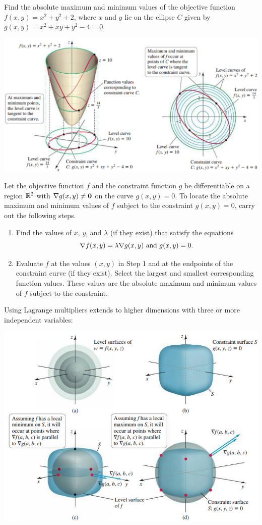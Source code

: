 \documentclass[mathNotesPreamble]{subfiles}
\begin{document}
  \begin{ex*}
    Find the absolute maximum and minimum values of the objective function $f(x,y)=x^2+y^2+2$, where $x$ and $y$ lie on the ellipse $C$ given by $g(x,y)=x^2+xy+y^2-4=0$.
  \end{ex*}
  \begin{flushright}
    \includegraphics[width=0.65\linewidth]{images/briggs_15_08/fig15_81}
  \end{flushright}
  \pagebreak

  \begin{thmBox*}
    Let the objective function $f$ and the constraint function $g$ be differentiable on a region $\mathbb{R}^2$ with $\nabla g(x,y)\neq\mathbf{0}$ on the curve $g(x,y)=0$. To locate the absolute maximum and minimum values of $f$ subject to the constraint $g(x,y)=0$, carry out the following steps.
    \begin{enumerate}
      \item 
        Find the values of $x$, $y$, and $\lambda$ (if they exist) that satisfy the equations
          \[\nabla f(x,y)=\lambda \nabla g(x,y) \textnormal{ and } g(x,y)=0.\]
      \item 
        Evaluate $f$ at the values $(x,y)$ in Step 1 and at the endpoints of the constraint curve (if they exist). Select the largest and smallest corresponding function values. These values are the absolute maximum and minimum values of $f$ subject to the constraint.
    \end{enumerate}
  \end{thmBox*}

  \noindent
  Using Lagrange multipliers extends to higher dimensions with three or more independent variables:
  \begin{center}
    \includegraphics[width=0.605\linewidth]{images/briggs_15_08/fig15_82}
  \end{center}
  \pagebreak
\end{document}
